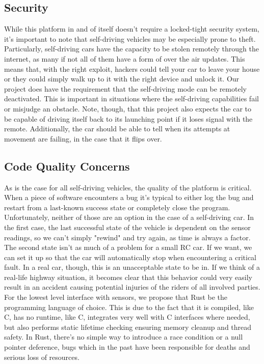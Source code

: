 \documentclass[onecolumn, draftclsnofoot,10pt]{IEEEtran}
\begin{document}
\subsection{Security}
    While this platform in and of itself doesn't require a locked-tight security system, it's important to note that self-driving vehicles may be especially prone to theft. Particularly, self-driving cars have the capacity to be stolen remotely through the internet, as many if not all of them have a form of over the air updates. This means that, with the right exploit, hackers could tell your car to leave your house or they could simply walk up to it with the right device and unlock it. Our project does have the requirement that the self-driving mode can be remotely deactivated. This is important in situations where the self-driving capabilities fail or misjudge an obstacle. Note, though, that this project also expects the car to be capable of driving itself back to its launching point if it loses signal with the remote. Additionally, the car should be able to tell when its attempts at movement are failing, in the case that it flips over.
    
\subsection{Code Quality Concerns}
    As is the case for all self-driving vehicles, the quality of the platform is critical. When a piece of software encounters a bug it's typical to either log the bug and restart from a last-known success state or completely close the program. Unfortunately, neither of those are an option in the case of a self-driving car. In the first case, the last successful state of the vehicle is dependent on the sensor readings, so we can't simply "rewind" and try again, as time is always a factor. The second state isn't as much of a problem for a small RC car. If we want, we can set it up so that the car will automatically stop when encountering a critical fault. In a real car, though, this is an unacceptable state to be in. If we think of a real-life highway situation, it becomes clear that this behavior could very easily result in an accident causing potential injuries of the riders of all involved parties. For the lowest level interface with sensors, we propose that Rust be the programming language of choice. This is due to the fact that it is compiled, like C, has no runtime, like C, integrates very well with C interfaces where needed, but also performs static lifetime checking ensuring memory cleanup and thread safety. In Rust, there's no simple way to introduce a race condition or a null pointer deference, bugs which in the past have been responsible for deaths and serious loss of resources.
    
\end{document}
